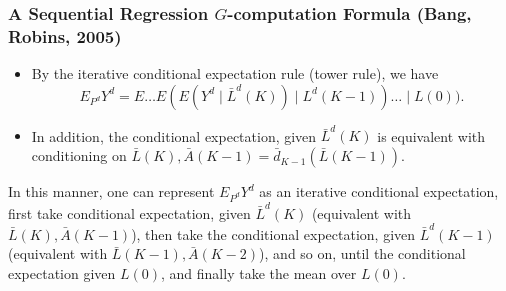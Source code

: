 \documentclass[t]{beamer}
\begin{document}
\begin{frame}
\frametitle{A Sequential Regression $G$-computation Formula (Bang, Robins, 2005)}
\begin{itemize}
\item
By the iterative conditional expectation rule (tower rule), we have\[E_{P^d}Y^d=E\ldots E(E(Y^d\mid \bar{L}^d(K))\mid L^d(K-1))\ldots \mid L(0)).\]
\item
In addition, the conditional expectation, given $\bar{L}^d(K)$ is equivalent with conditioning on 
$\bar{L}(K),\bar{A}(K-1)=\bar{d}_{K-1}(\bar{L}(K-1))$.
\end{itemize}
In this manner, one can represent $E_{P^d}Y^d$ as an iterative conditional expectation, first take conditional expectation, given $\bar{L}^d(K)$ (equivalent with $\bar{L}(K),\bar{A}(K-1)$), then take the conditional expectation, given $\bar{L}^d(K-1)$ (equivalent with $\bar{L}(K-1),\bar{A}(K-2)$),  and so on, until the conditional expectation given $L(0)$, and finally take the mean over $L(0)$.
\end{frame}


\end{document}
